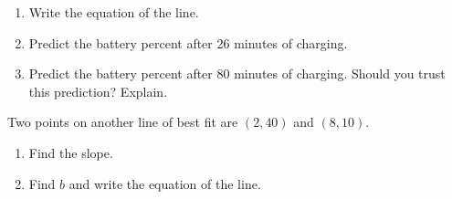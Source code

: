 \documentclass[11pt]{article}
\begin{document}
\begin{enumerate}
\vspace{0.6em}
\begin{enumerate}[start=4,itemsep=1.2em]
  \item Write the equation of the line. 
  \work{1em}
  \item Predict the battery percent after 26 minutes of charging.

  \work{2.5em}
  \item Predict the battery percent after 80 minutes of charging. Should you trust this prediction? Explain.

  \work{3em}
\end{enumerate}

\vspace{0.6em}
Two points on another line of best fit are $(2, 40)$ and $(8, 10)$.
\begin{enumerate}[start=7,itemsep=1.2em]
  \item Find the slope.

  \work{3em}
  \item Find $b$ and write the equation of the line.

  \work{3em}
\end{enumerate}

\end{enumerate}
\end{document}
